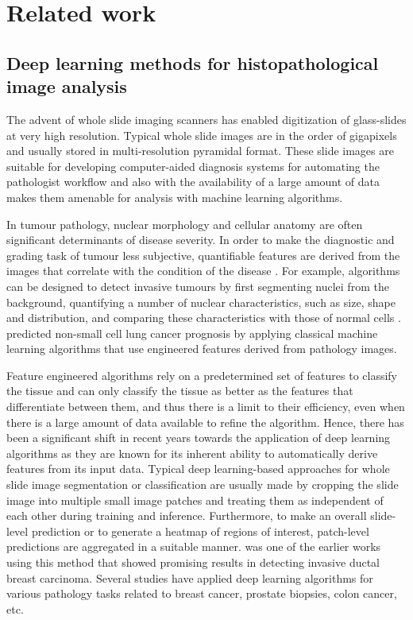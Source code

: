 \documentclass[times,twocolumn,final,authoryear]{tmp}
\begin{document}
\section{Related work}
\label{path_sec:path_prior}
\subsection{Deep learning methods for histopathological image analysis}

The advent of whole slide imaging scanners has enabled digitization of glass-slides at very high resolution. Typical whole slide images are in the  order of gigapixels and usually stored in multi-resolution pyramidal format. These slide images are suitable for developing computer-aided diagnosis systems for automating the pathologist workflow and also with the availability of a large amount of data makes them amenable for analysis with machine learning algorithms. 

In tumour pathology, nuclear morphology and cellular anatomy are often significant determinants of disease severity. In order to make the diagnostic and grading task of tumour less subjective, quantifiable features are derived from the images that correlate with the condition of the disease \citep{gurcan2009histopathological}. For example, algorithms can be designed to detect invasive tumours by first segmenting nuclei from the background, quantifying a number of nuclear characteristics, such as size, shape and distribution, and comparing these characteristics with those of normal cells \citep{diamond2004use}. \citep{yu2016predicting} predicted non-small cell lung cancer prognosis by applying classical machine learning algorithms that use engineered features derived from pathology images.

Feature engineered algorithms rely on a predetermined set of features to classify the tissue and can only classify the tissue as better as the features that differentiate between them, and thus there is a limit to their efficiency, even when there is a large amount of data available to refine the algorithm. Hence, there has been a significant shift in recent years towards the application of deep learning algorithms as they are known for its inherent ability to automatically derive features from its input data. Typical deep learning-based approaches for whole slide image segmentation or classification are usually made by cropping the slide image into multiple small image patches and treating them as independent of each other during training and inference. Furthermore, to make an overall slide-level prediction or to generate a heatmap of regions of interest, patch-level predictions are aggregated in a suitable manner. \citep{cruz2014automatic} was one of the earlier works using this method that showed promising results in detecting invasive ductal breast carcinoma. Several studies have applied deep learning algorithms for various pathology tasks related to breast cancer, prostate biopsies, colon cancer, etc. 
\end{document}
